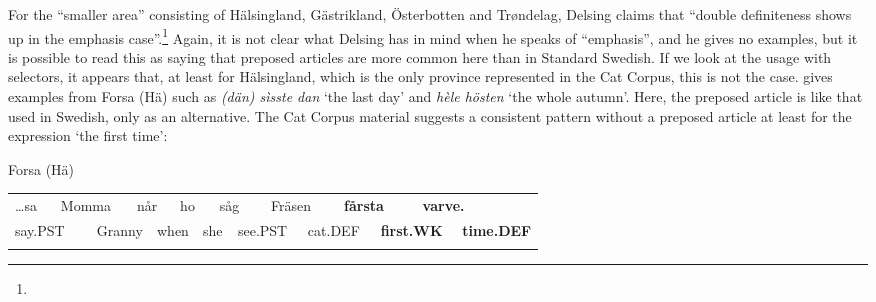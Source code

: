 \begin{styleBodyTextFirst}
For the “smaller area” consisting of Hälsingland, Gästrikland, Österbotten and Trøndelag, Delsing claims that “double definiteness shows up in the emphasis case”.\footnote{} Again, it is not clear what Delsing has in mind when he speaks of “emphasis”, and he gives no examples, but it is possible to read this as saying that preposed articles are more common here than in Standard Swedish. If we look at the usage with selectors, it appears that, at least for Hälsingland, which is the only province represented in the Cat Corpus, this is not the case. \citet[31]{Franck1995} gives examples from Forsa (Hä) such as \textit{(dän) sìsste dan} ‘the last day’ and \textit{hèle hösten} ‘the whole autumn’.  Here, the preposed article is like that used in Swedish, only as an alternative. The Cat Corpus material suggests a consistent pattern without a preposed article at least for the expression ‘the first time’:

\end{styleBodyTextFirst}

\begin{listWWNumileveli}
\item {}

\end{listWWNumileveli}

\begin{listWWNumlxxileveli}
\item {}

\begin{styleExLtrTbl}
Forsa (Hä)

\end{styleExLtrTbl}

\end{listWWNumlxxileveli}

\begin{tabular}{llllllllllllllll}
\lsptoprule
…sa & \multicolumn{2}{l}{Momma

} & \multicolumn{2}{l}{når

} & \multicolumn{2}{l}{ho

} & \multicolumn{2}{l}{såg

} & \multicolumn{2}{l}{Fräsen

} & \multicolumn{2}{l}{{\bfseries fårsta}

} & \multicolumn{2}{l}{{\bfseries varve.}

} & \\
\multicolumn{2}{l}{say.PST

} & \multicolumn{2}{l}{Granny

} & \multicolumn{2}{l}{when

} & \multicolumn{2}{l}{she

} & \multicolumn{2}{l}{see.PST

} & \multicolumn{2}{l}{cat.DEF

} & \multicolumn{2}{l}{{\bfseries first.WK}

} & \multicolumn{2}{l}{{\bfseries time.DEF}

}\\
\lspbottomrule
\end{tabular}

